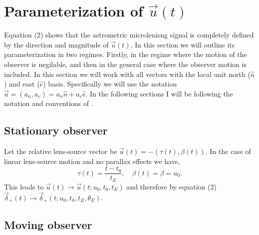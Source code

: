 \documentclass[11pt]{article}
\begin{document}
\section{Parameterization of $\vec{u}(t)$}
%
Equation (2) shows that the astrometric microlenisng signal is completely
defined by the direction and magnitude of $\vec{u}(t)$. In this section we will outline
its parameterization in two regimes. Firstly, in the regime where the motion of the observer
is negilable, and then in the general case where the observer motion is included. 
In this section we will work with all vectors with the local unit north ($\hat{n}$) 
and east ($\hat{e}$) basis. Specifically we will use the notation 
$\vec{a} = (a_{n},a_{e}) = a_{n}\hat{n} + a_{e}\hat{e}$. In the following sections
I will be following the notation and conventions of \cite{Gould04}.

\subsection{Stationary observer}

Let the relative lens-source vector be $\vec{u}(t) = -(\tau(t),\beta(t))$. In the case
of linear lens-source motion and no parallax effects we have,
%
\begin{equation}
\tau(t) = \frac{t-t_{0}}{t_{E}}, \quad \beta(t) = \beta
        = u_{0}.
\end{equation}
%
This leads to $\vec{u}(t) \to \vec{u}(t;u_{0},t_{0},t_{E})$ and therefore
by equation (2) $\vec{\delta}_{+}(t) \to \vec{\delta}_{+}(t;u_{0},t_{0},t_{E},\theta_{E})$.

\subsection{Moving observer}
\end{document}
